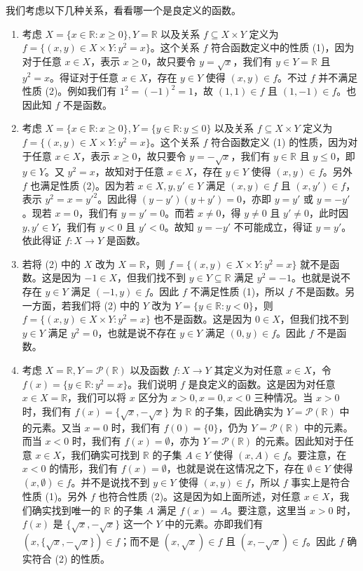 \begin{example}
我们考虑以下几种关系，看看哪一个是良定义的函数。
\begin{enumerate}
    \item 考虑 $X = \{x \in \mathbb{R} : x \geq 0\}, Y = \mathbb{R}$ 以及关系 $f \subseteq X \times Y$ 定义为 $f = \{(x, y) \in X \times Y : y^2 = x\}$。这个关系 $f$ 符合函数定义中的性质 (1)，因为对于任意 $x \in X$，表示 $x \geq 0$，故只要令 $y = \sqrt{x}$，我们有 $y \in Y = \mathbb{R}$ 且 $y^2 = x$。得证对于任意 $x \in X$，存在 $y \in Y$ 使得 $(x, y) \in f$。不过 $f$ 并不满足性质 (2)。例如我们有 $1^2 = (-1)^2 = 1$，故 $(1, 1) \in f$ 且 $(1, -1) \in f$。也因此知 $f$ 不是函数。
    \item 考虑 $X = \{x \in \mathbb{R} : x \geq 0\}, Y = \{y \in \mathbb{R} : y \leq 0\}$ 以及关系 $f \subseteq X \times Y$ 定义为 $f = \{(x, y) \in X \times Y : y^2 = x\}$。这个关系 $f$ 符合函数定义 (1) 的性质，因为对于任意 $x \in X$，表示 $x \geq 0$，故只要令 $y = -\sqrt{x}$，我们有 $y \in \mathbb{R}$ 且 $y \leq 0$，即 $y \in Y$。又 $y^2 = x$，故知对于任意 $x \in X$，存在 $y \in Y$ 使得 $(x, y) \in f$。另外 $f$ 也满足性质 (2)。因为若 $x \in X, y, y' \in Y$ 满足 $(x, y) \in f$ 且 $(x, y') \in f$，表示 $y^2 = x = y'^2$。因此得 $(y - y')(y + y') = 0$，亦即 $y = y'$ 或 $y = -y'$。现若 $x = 0$，我们有 $y = y' = 0$。而若 $x \neq 0$，得 $y \neq 0$ 且 $y' \neq 0$，此时因 $y, y' \in Y$，我们有 $y < 0$ 且 $y' < 0$。故知 $y = -y'$ 不可能成立，得证 $y = y'$。依此得证 $f : X \to Y$ 是函数。
    \item 若将 (2) 中的 $X$ 改为 $X = \mathbb{R}$，则 $f = \{(x, y) \in X \times Y : y^2 = x\}$ 就不是函数。这是因为 $-1 \in X$，但我们找不到 $y \in Y \subseteq \mathbb{R}$ 满足 $y^2 = -1$。也就是说不存在 $y \in Y$ 满足 $(-1, y) \in f$。因此 $f$ 不满足性质 (1)，所以 $f$ 不是函数。另一方面，若我们将 (2) 中的 $Y$ 改为 $Y = \{y \in \mathbb{R} : y < 0\}$，则 $f = \{(x, y) \in X \times Y : y^2 = x\}$ 也不是函数。这是因为 $0 \in X$，但我们找不到 $y \in Y$ 满足 $y^2 = 0$，也就是说不存在 $y \in Y$ 满足 $(0, y) \in f$。因此 $f$ 不是函数。
    \item 考虑 $X = \mathbb{R}, Y = \mathcal{P}(\mathbb{R})$ 以及函数 $f : X \to Y$ 其定义为对任意 $x \in X$，令 $f(x) = \{y \in \mathbb{R} : y^2 = x\}$。我们说明 $f$ 是良定义的函数。这是因为对任意 $x \in X = \mathbb{R}$，我们可以将 $x$ 区分为 $x > 0, x = 0, x < 0$ 三种情况。当 $x > 0$ 时，我们有 $f(x) = \{\sqrt{x}, -\sqrt{x}\}$ 为 $\mathbb{R}$ 的子集，因此确实为 $Y = \mathcal{P}(\mathbb{R})$ 中的元素。又当 $x = 0$ 时，我们有 $f(0) = \{0\}$，仍为 $Y = \mathcal{P}(\mathbb{R})$ 中的元素。而当 $x < 0$ 时，我们有 $f(x) = \emptyset$，亦为 $Y = \mathcal{P}(\mathbb{R})$ 的元素。因此知对于任意 $x \in X$，我们确实可找到 $\mathbb{R}$ 的子集 $A \in Y$ 使得 $(x, A) \in f$。要注意，在 $x < 0$ 的情形，我们有 $f(x) = \emptyset$，也就是说在这情况之下，存在 $\emptyset \in Y$ 使得 $(x, \emptyset) \in f$。并不是说找不到 $y \in Y$ 使得 $(x, y) \in f$，所以 $f$ 事实上是符合性质 (1)。另外 $f$ 也符合性质 (2)。这是因为如上面所述，对任意 $x \in X$，我们确实找到唯一的 $\mathbb{R}$ 的子集 $A$ 满足 $f(x) = A$。要注意，这里当 $x > 0$ 时，$f(x)$ 是 $\{\sqrt{x}, -\sqrt{x}\}$ 这一个 $Y$ 中的元素。亦即我们有 $(x, \{\sqrt{x}, -\sqrt{x}\}) \in f$；而不是 $(x, \sqrt{x}) \in f$ 且 $(x, -\sqrt{x}) \in f$。因此 $f$ 确实符合 (2) 的性质。

\end{enumerate}
\end{example}
